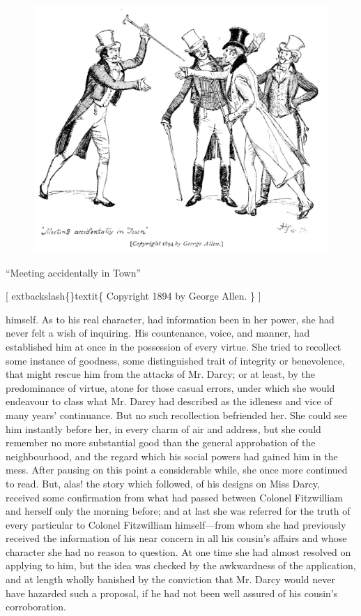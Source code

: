 \documentclass[10pt]{book}
\begin{document}
\begin{figure}[h]
\centering
\includegraphics[width=\linewidth]{images/i_285.jpg}
\end{figure}

      “Meeting accidentally in Town”
     

     [
     	extbackslash\{\}textit\{
      Copyright 1894 by George Allen.
     \}
     ]
    

   himself. As to his real character, had information been in her power,
she had never felt a wish of inquiring. His countenance, voice, and
manner, had established him at once in the possession of every virtue.
She tried to recollect some instance of goodness, some distinguished
trait of integrity or benevolence, that might rescue him from the
attacks of Mr. Darcy; or at least, by the predominance of virtue, atone
for those casual errors, under which she would endeavour to class what
Mr. Darcy had described as the idleness and vice of many years’
continuance. But no such recollection befriended her. She could see him
instantly before her, in every charm of air and address, but she could
remember no more substantial good than the general approbation of the
neighbourhood, and the regard which his social powers had
   gained him in
the mess. After pausing on this point a considerable while, she once
more continued to read. But, alas! the story which followed, of his
designs on Miss Darcy, received some confirmation from what had passed
between Colonel Fitzwilliam and herself only the morning before; and at
last she was referred for the truth of every particular to Colonel
Fitzwilliam himself—from whom she had previously received the
information of his near concern in all his cousin’s affairs and whose
character she had no reason to question. At one time she had almost
resolved on applying to him, but the idea was checked by the awkwardness
of the application, and at length wholly banished by the conviction that
Mr. Darcy would never have hazarded such a proposal, if he had not been
well assured of his cousin’s corroboration.
  
\end{document}
